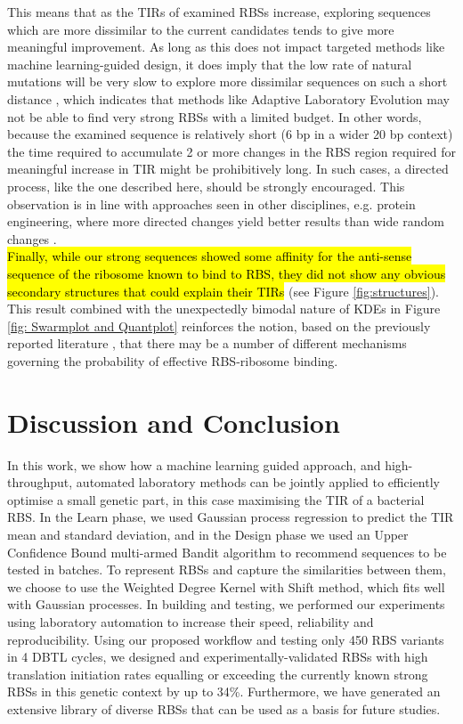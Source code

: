 \documentclass{article}
\begin{document}
This means that as the TIRs of examined RBSs increase, exploring sequences which are more dissimilar to the current candidates tends to give more meaningful improvement.
As long as this does not impact targeted methods like machine learning-guided design, it does imply that the low rate of natural mutations will be very slow to explore more dissimilar sequences on such a short distance \cite{Lee2012}, which indicates that methods like Adaptive Laboratory Evolution may not be able to find very strong RBSs with a limited budget.
In other words, because the examined sequence is relatively short (6 bp in a wider 20 bp context) the time required to accumulate 2 or more changes in the RBS region required for meaningful increase in TIR might be prohibitively long.
In such cases, a directed process, like the one described here, should be strongly encouraged.
This observation is in line with approaches seen in other disciplines, e.g. protein engineering, where more directed changes yield better results than wide random changes \cite{Jackel2008}.\\

\hl{Finally, while our strong sequences showed some affinity for the anti-sense sequence of the ribosome known to bind to RBS, they did not show any obvious secondary structures that could explain their TIRs} (see Figure \ref{fig:structures}).
This result combined with the unexpectedly bimodal nature of KDEs in Figure \ref{fig: Swarmplot and Quantplot} reinforces the notion, based on the previously reported literature \cite{Saito2020,EspahBorujeni2016}, that there may be a number of different mechanisms governing the probability of effective RBS-ribosome binding.\\



\section{Discussion and Conclusion}

In this work, we show how a machine learning guided approach, and high-throughput, automated laboratory methods can be jointly applied to efficiently optimise a small genetic part, in this case maximising the TIR of a bacterial RBS.
In the Learn phase, we used Gaussian process regression to predict the TIR mean and standard deviation, and in the Design phase we used an Upper Confidence Bound multi-armed Bandit algorithm to recommend sequences to be tested in batches.
To represent RBSs and capture the similarities between them, we choose to use
the Weighted Degree Kernel with Shift method, which fits well with Gaussian processes.
In building and testing, we performed our experiments using laboratory
automation to increase their speed, reliability and reproducibility.
Using our proposed workflow and testing only 450 RBS variants in 4 DBTL cycles,
we designed and experimentally-validated RBSs with high translation initiation rates equalling or exceeding the currently known strong RBSs in this genetic context by up to 34\%.
Furthermore, we have generated an extensive library of diverse RBSs that can be used as a basis for future studies.\\
\end{document}
